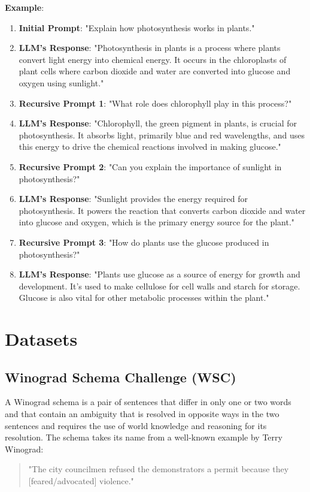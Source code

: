 \documentclass{article}
\begin{document}
\textbf{Example}:
\begin{enumerate}
    \item \textbf{Initial Prompt}: "Explain how photosynthesis works in plants."
    \item \textbf{LLM's Response}: "Photosynthesis in plants is a process where plants convert light energy into chemical energy. It occurs in the chloroplasts of plant cells where carbon dioxide and water are converted into glucose and oxygen using sunlight."
    \item \textbf{Recursive Prompt 1}: "What role does chlorophyll play in this process?"
    \item \textbf{LLM's Response}: "Chlorophyll, the green pigment in plants, is crucial for photosynthesis. It absorbs light, primarily blue and red wavelengths, and uses this energy to drive the chemical reactions involved in making glucose."
    \item \textbf{Recursive Prompt 2}: "Can you explain the importance of sunlight in photosynthesis?"
    \item \textbf{LLM's Response}: "Sunlight provides the energy required for photosynthesis. It powers the reaction that converts carbon dioxide and water into glucose and oxygen, which is the primary energy source for the plant."
    \item \textbf{Recursive Prompt 3}: "How do plants use the glucose produced in photosynthesis?"
    \item \textbf{LLM's Response}: "Plants use glucose as a source of energy for growth and development. It's used to make cellulose for cell walls and starch for storage. Glucose is also vital for other metabolic processes within the plant."
\end{enumerate}

\section{Datasets}
\subsection{Winograd Schema Challenge (WSC)}
A Winograd schema is a pair of sentences that differ in only one or two words and that contain an ambiguity that is resolved in opposite ways in the two sentences and requires the use of world knowledge and reasoning for its resolution. The schema takes its name from a well-known example by Terry Winograd:
\begin{quote}
    "The city councilmen refused the demonstrators a permit because they [feared/advocated] violence."
\end{quote}
\end{document}
